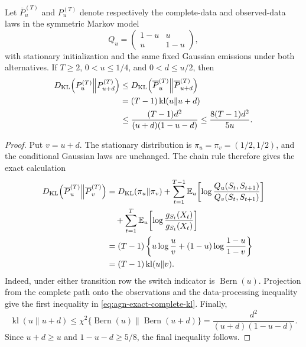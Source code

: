 \begin{lemma}
\label{lem:agn-symmetric-exact-kl}
Let \(\overline P_u^{(T)}\) and \(P_u^{(T)}\) denote respectively the
complete-data and observed-data laws in the symmetric Markov model
\[
 Q_u=\begin{pmatrix}1-u&u\\u&1-u\end{pmatrix},
\]
with stationary initialization and the same fixed Gaussian emissions under
both alternatives.  If \(T\geq2\), \(0<u\leq1/4\), and \(0<d\leq u/2\), then
\begin{align}
 D_{\rm KL}\!\left(P_u^{(T)}\middle\|P_{u+d}^{(T)}\right)
 &\leq
 D_{\rm KL}\!\left(\overline P_u^{(T)}
 \middle\|\overline P_{u+d}^{(T)}\right)
 \nonumber\\
 &=(T-1)\operatorname{kl}(u\|u+d)
 \nonumber\\
 &\leq
 \frac{(T-1)d^2}{(u+d)(1-u-d)}
 \leq\frac{8(T-1)d^2}{5u}.
 \label{eq:agn-exact-complete-kl}
\end{align}
\end{lemma}

\begin{proof}
Put \(v=u+d\).  The stationary distribution is
\(\pi_u=\pi_v=(1/2,1/2)\), and the conditional Gaussian laws are unchanged.
The chain rule therefore gives the exact calculation
\begin{align*}
 D_{\rm KL}\!\left(\overline P_u^{(T)}
 \middle\|\overline P_v^{(T)}\right)
 &=D_{\rm KL}(\pi_u\|\pi_v)
 +\sum_{t=1}^{T-1}
 \mathbb E_u\!\left[
 \log\frac{Q_u(S_t,S_{t+1})}{Q_v(S_t,S_{t+1})}
 \right]
 \nonumber\\
 &\quad+
 \sum_{t=1}^{T}
 \mathbb E_u\!\left[
 \log\frac{g_{S_t}(X_t)}{g_{S_t}(X_t)}
 \right]
 \\
 &=(T-1)\left\{
 u\log\frac{u}{v}
 +(1-u)\log\frac{1-u}{1-v}
 \right\}
 \\
 &=(T-1)\operatorname{kl}(u\|v).
\end{align*}
Indeed, under either transition row the switch indicator is
\(\operatorname{Bern}(u)\).  Projection from the complete path onto the
observations and the data-processing inequality give the first inequality in
\eqref{eq:agn-exact-complete-kl}.  Finally,
\[
 \operatorname{kl}(u\|u+d)
 \leq
 \chi^2\{\operatorname{Bern}(u)\|
 \operatorname{Bern}(u+d)\}
 =\frac{d^2}{(u+d)(1-u-d)}.
\]
Since \(u+d\geq u\) and
\(1-u-d\geq5/8\), the final inequality follows.
\end{proof}


